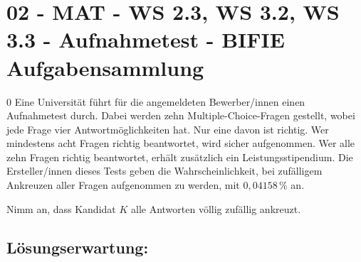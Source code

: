 \section{02 - MAT - WS 2.3, WS 3.2, WS 3.3 - Aufnahmetest - BIFIE Aufgabensammlung}

\begin{langesbeispiel} \item[0] %
Eine Universität führt für die angemeldeten Bewerber/innen einen Aufnahmetest durch. Dabei werden zehn Multiple-Choice-Fragen gestellt, wobei jede Frage vier Antwortmöglichkeiten hat.
Nur eine davon ist richtig. Wer mindestens acht Fragen richtig beantwortet, wird sicher aufgenommen. Wer alle zehn Fragen richtig beantwortet, erhält zusätzlich ein Leistungsstipendium.
Die Ersteller/innen dieses Tests geben die Wahrscheinlichkeit, bei zufälligem Ankreuzen aller Fragen aufgenommen zu werden, mit $0,04158\,\%$ an. 

Nimm an, dass Kandidat $K$ alle Antworten völlig zufällig ankreuzt.%

\begin{aufgabenstellung}
\item %


\item



\end{aufgabenstellung}

\begin{loesung}
\item \subsection{Lösungserwartung:} 

\end{loesung}
\end{langesbeispiel}
